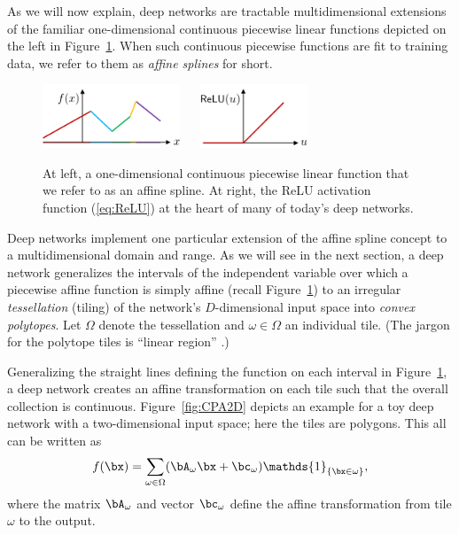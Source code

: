 \documentclass{notices}
\begin{document}

As we will now explain, deep networks are tractable multidimensional extensions of the familiar one-dimensional continuous piecewise linear functions depicted on the left in Figure~\ref{fig:1Dspline}.
When such continuous piecewise functions are fit to training data, we refer to them as {\em affine splines} for short.


\begin{figure}[h]
    \centering
\includegraphics[height=19mm]{Figs/spline1d.pdf} ~~
\includegraphics[height=19mm]{Figs/relu1.pdf}
    \caption{\small
    At left, a one-dimensional continuous piecewise linear function that we refer to as an affine spline. 
    At right, the ReLU activation function (\ref{eq:ReLU}) at the heart of many of today's deep networks.}
    \label{fig:1Dspline}
\end{figure}


Deep networks implement one particular extension of the affine spline concept to a multidimensional domain and range.
As we will see in the next section, a deep network generalizes the intervals of the independent variable over which a piecewise affine function is simply affine (recall Figure~\ref{fig:1Dspline}) to an irregular {\em tessellation} (tiling) of the network's $D$-dimensional input space into {\em convex polytopes}.
Let $\Omega$ denote the tessellation and $\omega\in\Omega$ an individual tile.
(The jargon for the polytope tiles is ``linear region'' \cite{montufar2014number}.)


Generalizing the straight lines defining the function on each interval in Figure~\ref{fig:1Dspline}, a deep network creates an affine transformation on each tile such that the overall collection is continuous.
Figure~\ref{fig:CPA2D} depicts an example for a toy deep network with a two-dimensional input space; here the tiles are polygons.
This all can be written as \cite{balestriero2021madmax}
\begin{equation}
f(\bx) = \sum_{\omega \in \Omega}(\bA_{\omega}\bx + \bc_{\omega}) \mathds{1}_{\{\bx \in \omega\}},
\label{eq:spline1}
\end{equation}
where the matrix $\bA_{\omega}$ and vector $\bc_{\omega}$ define the affine transformation from tile $\omega$ to the output.
\end{document}
